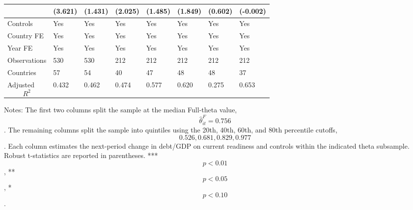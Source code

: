 \begin{table}[H]
\begin{threeparttable}
\begin{tabularx}{\textwidth}{lYYYYYYY}
  & (3.621) & (1.431) & (2.025) & (1.485) & (1.849) & (0.602) & (-0.002) \\
\midrule
Controls & Yes & Yes & Yes & Yes & Yes & Yes & Yes \\
Country FE & Yes & Yes & Yes & Yes & Yes & Yes & Yes \\
Year FE & Yes & Yes & Yes & Yes & Yes & Yes & Yes \\
Observations & 530 & 530 & 212 & 212 & 212 & 212 & 212 \\
Countries & 57 & 54 & 40 & 47 & 48 & 48 & 37 \\
Adjusted $$R^2$$ & 0.432 & 0.462 & 0.474 & 0.577 & 0.620 & 0.275 & 0.653 \\
\bottomrule
\end{tabularx}
\begin{tablenotes}[flushleft]\footnotesize
\item Notes: The first two columns split the sample at the median Full-theta value, $$\widehat{\theta}^{F}_{it}=0.756$$. The remaining columns split the sample into quintiles using the 20th, 40th, 60th, and 80th percentile cutoffs, $$0.526, 0.681, 0.829, 0.977$$. Each column estimates the next-period change in debt/GDP on current readiness and controls within the indicated theta subsample. Robust t-statistics are reported in parentheses. *** $$p<0.01$$, ** $$p<0.05$$, * $$p<0.10$$.
\end{tablenotes}
\end{threeparttable}
\end{table}
